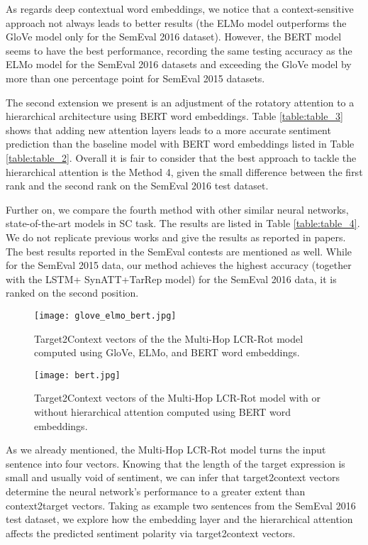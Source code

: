 \documentclass[hidelinks]{llncs}
\begin{document}
As regards deep contextual word embeddings, we notice that a context-sensitive approach not always leads to better results (the ELMo model outperforms the GloVe model only for the SemEval 2016 dataset). However, the BERT model seems to have the best performance, recording the same testing accuracy as the ELMo model for the SemEval 2016 datasets and exceeding the GloVe model by more than one percentage point for SemEval 2015 datasets.

The second extension we present is an adjustment of the rotatory attention to a hierarchical architecture using BERT word embeddings. Table \ref{table:table_3} shows that adding new attention layers leads to a more accurate sentiment prediction than the baseline model with BERT word embeddings listed in Table \ref{table:table_2}. Overall it is fair to consider that the best approach to tackle the hierarchical attention is the Method 4, given the small difference between the first rank and the second rank on the SemEval 2016 test dataset. 

Further on, we compare the fourth method with other similar neural networks, state-of-the-art models in SC task. The results are listed in Table \ref{table:table_4}. We do not replicate previous works and give the results as reported in papers. The best results reported in the SemEval contests are mentioned as well. While for the SemEval 2015 data, our method achieves the highest accuracy (together with the LSTM+ SynATT+TarRep \cite{he2018effective} model) for the SemEval 2016 data, it is ranked on the second position.

\begin{figure}[!b]
\vspace{-0.8cm}
\begin{center}
\texttt{[image: glove\_elmo\_bert.jpg]}\end{center}
\caption{Target2Context vectors of the the Multi-Hop LCR-Rot model computed using GloVe, ELMo, and BERT word embeddings.} 	
\label{fig:figure_2}
\end{figure} 

\begin{figure}[t]
\centering
\texttt{[image: bert.jpg]}\caption{Target2Context vectors of the Multi-Hop LCR-Rot model with or without hierarchical attention computed using BERT word embeddings.} 	
\label{fig:figure_3}
\vspace{-0.5cm}
\end{figure} 

As we already mentioned, the Multi-Hop LCR-Rot model turns the input sentence into four vectors. Knowing that the length of the target expression is small and usually void of sentiment, we can infer that target2context vectors determine the neural network's performance to a greater extent than context2target vectors. Taking as example two sentences from the SemEval 2016 test dataset, we explore how the embedding layer and the hierarchical attention affects the predicted sentiment polarity via target2context vectors. 
\end{document}
